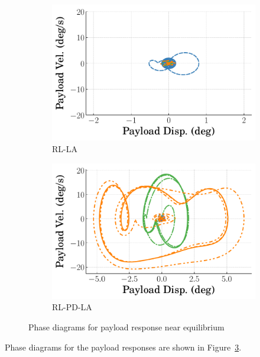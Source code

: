 \begin{figure}[h!]
\begin{subfigure}[b]{0.49\textwidth}
    \centering
    \includegraphics[width=\textwidth]{figures/figures_stability/time_responses_crane/dpcrane_RL_LA/dpcrane_RL_LA_payload_phase_plots.pdf}
    \caption{RL-LA}
    \label{subfig_chap3:dpcrane_RL_LA_phase_payload}
  \end{subfigure}
  \hfill
  \begin{subfigure}[b]{0.49\textwidth}
      \centering
      \includegraphics[width=\textwidth]{figures/figures_stability/time_responses_crane/dpcrane_RL_PD_LA/dpcrane_RL_PD_LA_payload_phase_plots.pdf}
      \caption{RL-PD-LA}
      \label{subfig_chap3:dpcrane_RL_PD_LA_phase_payload}
  \end{subfigure}
  \hfill
  \caption{Phase diagrams for payload response near equilibrium}
  \label{fig_chap3:dpcrane_near_equil_phase_payload}
\end{figure}
%
Phase diagrams for the payload responses are shown in Figure~\ref{fig_chap3:dpcrane_near_equil_phase_payload}.
